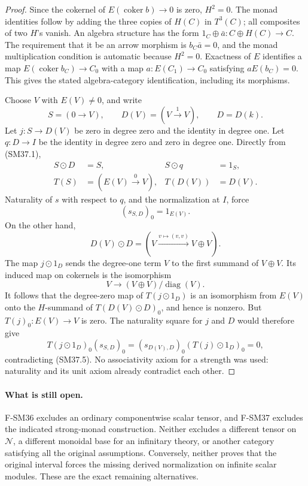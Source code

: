 \begin{proof}
Since the cokernel of \(E(\operatorname{coker}b)\to0\) is
zero, \(H^2=0\).  The monad identities follow by adding the
three copies of \(H(C)\) in \(T^3(C)\); all composites of two
\(H\)'s vanish.  An algebra structure has the form
\(1_C\oplus\bar a:C\oplus H(C)\to C\).  The requirement
that it be an arrow morphism is \(b_C\bar a=0\), and the
monad multiplication condition is automatic because \(H^2=0\).
Exactness of \(E\) identifies a map
\(E(\operatorname{coker}b_C)\to C_0\) with a map
\(a:E(C_1)\to C_0\) satisfying \(aE(b_C)=0\).
This gives the stated algebra-category identification, including
its morphisms.

Choose \(V\) with \(E(V)\ne0\), and write
\[
 S=(0\to V),\qquad D(V)=(V\xrightarrow{1}V),\qquad
 D=D(k).
\]
Let \(j:S\to D(V)\) be zero in degree zero and the identity
in degree one.  Let \(q:D\to I\) be the identity in degree
zero and zero in degree one.  Directly from (SM37.1),
\[
 \begin{aligned}
 S\odot D&=S, & S\odot q&=1_S,\\
 T(S)&=(E(V)\xrightarrow{0}V), & T(D(V))&=D(V).
 \end{aligned}
                                                               \tag{SM37.4}
\]
Naturality of \(s\) with respect to \(q\), and the
normalization at \(I\), force
\[
                    (s_{S,D})_0=1_{E(V)}.                    \tag{SM37.5}
\]
On the other hand,
\[
 D(V)\odot D=(V\xrightarrow{v\mapsto(v,v)}V\oplus V).
\]
The map \(j\odot1_D\) sends the degree-one term \(V\)
to the first summand of \(V\oplus V\).  Its induced map
on cokernels is the isomorphism
\[
       V\longrightarrow(V\oplus V)/\operatorname{diag}(V).
\]
It follows that the degree-zero map of \(T(j\odot1_D)\)
is an isomorphism from \(E(V)\) onto the \(H\)-summand of
\(T(D(V)\odot D)_0\), and hence is nonzero.
But \(T(j)_0:E(V)\to V\) is zero.  The naturality square
for \(j\) and \(D\) would therefore give
\[
 T(j\odot1_D)_0(s_{S,D})_0
   =(s_{D(V),D})_0(T(j)\odot1_D)_0=0,
\]
contradicting (SM37.5).  No associativity axiom for a strength
was used: naturality and its unit axiom already contradict
each other.
\end{proof}

\paragraph{What is still open.}
F-SM36 excludes an ordinary componentwise scalar tensor, and
F-SM37 excludes the indicated strong-monad construction.
Neither excludes a different tensor on \(\mathcal N\), a
different monoidal base for an infinitary theory, or another
category satisfying all the original assumptions.  Conversely,
neither proves that the original interval forces the missing
derived normalization on infinite scalar modules.  These are
the exact remaining alternatives.

